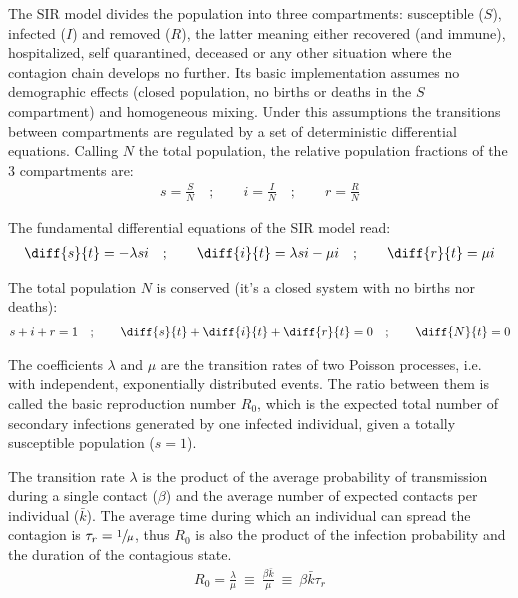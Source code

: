\documentclass[DIV=12, BCOR=0pt]{scrartcl}  %
\begin{document}
  The SIR model divides the population into three compartments: susceptible ($S$), infected ($I$) and removed ($R$), the latter meaning either recovered (and immune), hospitalized, self quarantined, deceased or any other situation where the contagion chain develops no further. Its basic implementation assumes no demographic effects (closed population, no births or deaths in the $S$ compartment) and homogeneous mixing. Under this assumptions the transitions between compartments are regulated by a set of deterministic differential equations. %
  Calling $N$ the total population, the relative population fractions of the 3 compartments are:
  \begin{align}
			s = \frac{S}{N}  \quad;  \qquad 	 i = \frac{I}{N}  \quad;  \qquad 	 r = \frac{R}{N}
  \end{align}

  The fundamental differential equations of the SIR model read:
  \begin{align}
  	\diff{s}{t} = - \lambda s i \quad;  \qquad 	\diff{i}{t} = \lambda s i - \mu i \quad; \qquad  \diff{r}{t} = \mu i
  	\label{eq:sir}
  \end{align}

  The total population $N$ is conserved (it's a closed system with no births nor deaths):  
  \begin{align}
  	s + i + r = 1 \quad ; \qquad \diff{s}{t} + \diff{i}{t} + \diff{r}{t} = 0  \quad ; \qquad  \diff{N}{t}= 0
  	\label{eq:sir_sum}
  \end{align}

	The coefficients $\lambda$ and $\mu$ are the transition rates of two Poisson processes, i.e. with independent, exponentially distributed events. The ratio between them is called the basic reproduction number $R_0$, which is the expected total number of secondary infections generated by one infected individual, given a totally susceptible population ($s=1$). 
	
	The transition rate $\lambda$ is the product of the average probability of transmission during a single contact ($\beta$) and the average number of expected contacts per individual ($\bar{k}$).
  The average time during which an individual can spread the contagion is $\tau_{r} = \sfrac{1}{\mu}$, thus $R_0$ is also the product of the infection probability and the duration of the contagious state. 
  \begin{align}
			R_0 = \frac{\lambda}{\mu} \ \equiv \ \frac{\beta \bar{k}}{\mu} \ \equiv \ \beta \bar{k} \tau_{r}
			\label{eq:R0}
  \end{align}
\end{document}
